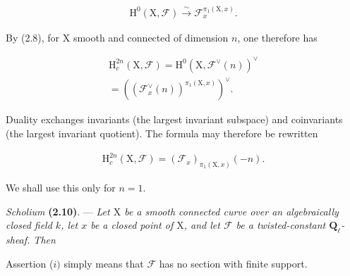 \documentclass[10pt,leqno]{article}
\begin{document}
\begin{equation*}\begin{gathered}\mathrm{H}^{0}(\mathrm{X},\mathcal{F} ) \xrightarrow{\sim } \mathcal{F} _{x}^{\pi _{1}(\mathrm{X},x)}.\end{gathered}\tag{2.9.1}\end{equation*}

\noindent By (2.8), for \(\mathrm{X}\) smooth and connected of dimension \(n\), one therefore has\par

\begin{equation*}\begin{gathered}\mathrm{H}_{c}^{2n}(\mathrm{X},\mathcal{F} ) = \mathrm{H}^{0}(\mathrm{X},\mathcal{F} ^{\vee }(n))^{\vee } \\ = ((\mathcal{F} _{x}^{\vee }(n))^{\pi _{1}(\mathrm{X},x)})^{\vee }.\end{gathered}\end{equation*}

\noindent Duality exchanges invariants (the largest invariant subspace) and coinvariants (the largest invariant quotient). The formula may therefore be rewritten\par

\begin{equation*}\begin{gathered}\mathrm{H}_{c}^{2n}(\mathrm{X},\mathcal{F} ) = (\mathcal{F} _{x})_{\pi _{1}(\mathrm{X},x)}(- n).\end{gathered}\end{equation*}

\noindent We shall use this only for \(n=1\).\par

\noindent \emph{Scholium} \textbf{(2.10)}. — {\itshape Let \(\mathrm{X}\) be a smooth connected curve over an algebraically closed field \(k\), let \(x\) be a closed point of \(\mathrm{X}\), and let \(\mathcal{F} \) be a twisted-constant \(\mathbf{Q}_{\ell }\)-sheaf. Then}\par

\par

\noindent Assertion (\(i)\) simply means that \(\mathcal{F} \) has no section with finite support.\par
\end{document}
